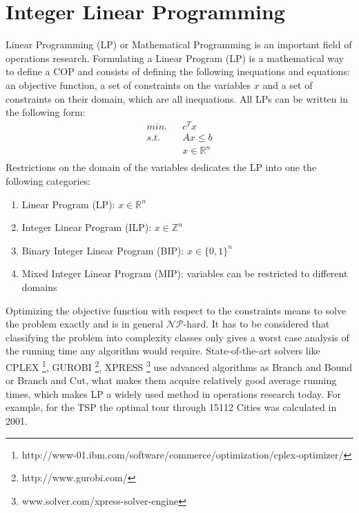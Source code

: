 \section{Integer Linear Programming}
Linear Programming (LP) or Mathematical Programming is an important field of operations research. Formulating a Linear Program (LP) is a mathematical way to define a COP and consists of defining the following inequations and equations: an objective function, a set of constraints on the variables $x$ and a set of constraints on their domain, which are all inequations.  All LPs can be written in the following form:
\begin{equation*}
\begin{aligned}
min. && c^Tx            \\
s.t. && Ax \leq b       \\
&& x \in \mathbb{R}^n \\
\end{aligned}
\end{equation*}
Restrictions on the domain of the variables dedicates the LP into one the following categories:
\begin{enumerate}
\item Linear Program (LP): $x \in \mathbb{R}^n$
\item Integer Linear Program (ILP): $x \in \mathbb{Z}^n$
\item Binary Integer Linear Program (BIP): $x \in \{0,1\}^n$
\item Mixed Integer Linear Program (MIP): variables can be restricted to different domains
\end{enumerate}
Optimizing the objective function with respect to the constraints means to solve the problem exactly and is in general $\mathcal{NP}$-hard. It has to be considered that classifying the problem into complexity classes only gives a worst case analysis of the running time any algorithm would require. State-of-the-art solvers like CPLEX \footnote{http://www-01.ibm.com/software/commerce/optimization/cplex-optimizer/}, GUROBI \footnote{http://www.gurobi.com/}, XPRESS \footnote{www.solver.com/xpress-solver-engine} use advanced algorithms as Branch and Bound or Branch and Cut, what makes them acquire relatively good average running times, which makes LP a widely used method in operations research today. For example, for the TSP the optimal tour through 15112 Cities was calculated in 2001. \cite{applegate-01}
